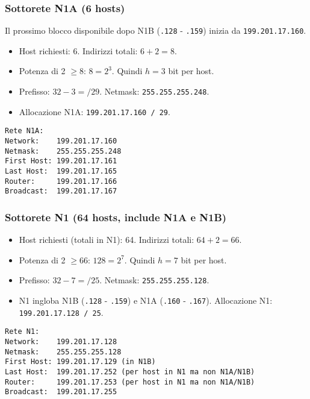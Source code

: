 \subsubsection{Sottorete N1A (6 hosts)}
Il prossimo blocco disponibile dopo N1B (\texttt{.128} - \texttt{.159}) inizia da \texttt{199.201.17.160}.
\begin{itemize}
    \item Host richiesti: 6. Indirizzi totali: $6 + 2 = 8$.
    \item Potenza di 2 $\geq 8$: $8 = 2^3$. Quindi $h=3$ bit per host.
    \item Prefisso: $32 - 3 = /29$. Netmask: \texttt{255.255.255.248}.
    \item Allocazione N1A: \texttt{199.201.17.160 / 29}.
\end{itemize}
\begin{verbatim}
Rete N1A:
Network:    199.201.17.160
Netmask:    255.255.255.248
First Host: 199.201.17.161
Last Host:  199.201.17.165
Router:     199.201.17.166
Broadcast:  199.201.17.167
\end{verbatim}

\subsubsection{Sottorete N1 (64 hosts, include N1A e N1B)}
\begin{itemize}
    \item Host richiesti (totali in N1): 64. Indirizzi totali: $64 + 2 = 66$.
    \item Potenza di 2 $\geq 66$: $128 = 2^7$. Quindi $h=7$ bit per host.
    \item Prefisso: $32 - 7 = /25$. Netmask: \texttt{255.255.255.128}.
    \item N1 ingloba N1B (\texttt{.128} - \texttt{.159}) e N1A (\texttt{.160} - \texttt{.167}). Allocazione N1: \texttt{199.201.17.128 / 25}.
\end{itemize}
\begin{verbatim}
Rete N1:
Network:    199.201.17.128
Netmask:    255.255.255.128
First Host: 199.201.17.129 (in N1B)
Last Host:  199.201.17.252 (per host in N1 ma non N1A/N1B)
Router:     199.201.17.253 (per host in N1 ma non N1A/N1B)
Broadcast:  199.201.17.255
\end{verbatim}

